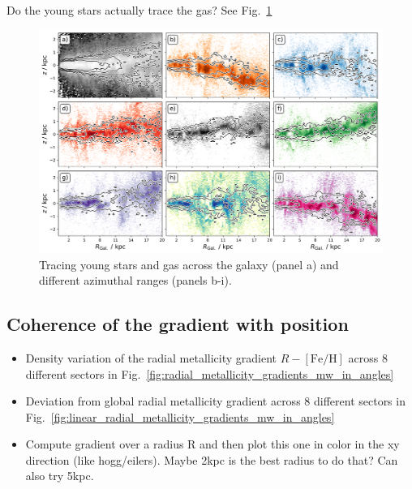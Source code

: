 \documentclass[fleqn,usenatbib]{mnras}
\begin{document}
Do the young stars actually trace the gas? See Fig.~\ref{fig:tracing_young_stars_and_gas_in_angles}

\begin{figure}
    \centering
    \includegraphics[width=\columnwidth]{figures/tracing_young_stars_and_gas_in_angles.png}
    \caption{Tracing young stars and gas across the galaxy (panel a) and different azimuthal ranges (panels b-i).}
    \label{fig:tracing_young_stars_and_gas_in_angles}
\end{figure}




\subsection{Coherence of the gradient with position}
\label{sec:coherence_position_radial_metallicity_gradients}

\begin{itemize}
    \item Density variation of the radial metallicity gradient $R-\mathrm{[Fe/H]}$ across 8 different sectors in Fig.~\ref{fig:radial_metallicity_gradients_mw_in_angles}
    \item Deviation from global radial metallicity gradient across 8 different sectors in Fig.~\ref{fig:linear_radial_metallicity_gradients_mw_in_angles}
    \item Compute gradient over a radius R and then plot this one in color in the xy direction (like hogg/eilers). Maybe 2kpc is the best radius to do that? Can also try 5kpc.
\end{itemize}
\end{document}
